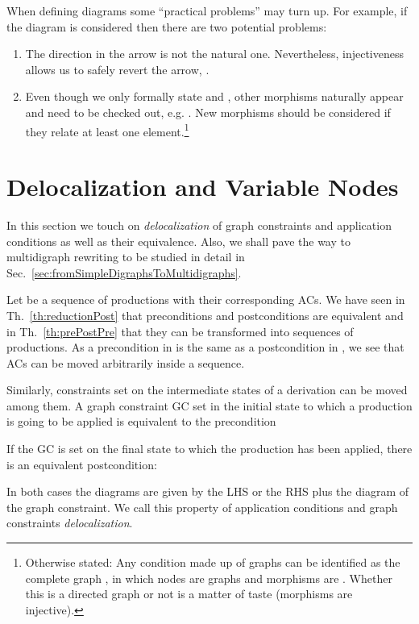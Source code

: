 \documentclass{fundam}
\begin{document}
When defining diagrams some ``practical problems'' may turn up.  For
example, if the diagram  is considered then there are two potential problems:
\begin{enumerate}
\item The direction in the arrow  is not the
  natural one.  Nevertheless, injectiveness allows us to safely revert
  the arrow, .
\item Even though we only formally state  and , other
  morphisms naturally appear and need to be checked out, e.g. .  New morphisms should be considered if they
  relate at least one element.\footnote{Otherwise stated: Any
    condition made up of  graphs  can be identified as the
    complete graph , in which nodes are graphs  and
    morphisms are .  Whether this is a directed graph or not
    is a matter of taste (morphisms are injective).}
\end{enumerate}

\section{Delocalization and Variable Nodes}
\label{sec:delocalization}


In this section we touch on \emph{delocalization} of graph constraints
and application conditions as well as their equivalence. Also, we
shall pave the way to multidigraph rewriting to be studied in detail
in Sec.~\ref{sec:fromSimpleDigraphsToMultidigraphs}.

Let  be a sequence of productions with their
corresponding ACs. We have seen in Th.~\ref{th:reductionPost} that
preconditions and postconditions are equivalent and in
Th.~\ref{th:prePostPre} that they can be transformed into sequences of
productions. As a precondition in  is the same as a
postcondition in , we see that ACs can be moved arbitrarily
inside a sequence.

Similarly, constraints set on the intermediate states of a derivation
can be moved among them. A graph constraint GC set in the initial
state  to which a production  is going to be applied is
equivalent to the precondition

If the GC is set on the final state  to which the
production  has been applied, there is an equivalent postcondition:

In both cases the diagrams are given by the LHS or the RHS plus the
diagram of the graph constraint. We call this property of application
conditions and graph constraints \emph{delocalization}.
\end{document}
